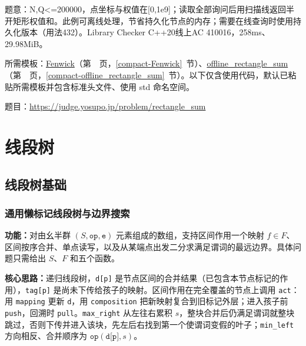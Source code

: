 \label{usage-example-436}

题意：N,Q<=200000，点坐标与权值在[0,1e9]；读取全部询问后用扫描线返回半开矩形权值和。此例可离线处理，节省持久化节点的内存；需要在线查询时使用持久化版本（用法432）。Library Checker C++20线上AC 410016，258ms、29.98MiB。

所需模板：\hyperref[compact-Fenwick]{Fenwick}（第~\pageref{compact-Fenwick}~页，\ref{compact-Fenwick}~节）、\hyperref[compact-offline_rectangle_sum]{offline\_\allowbreak{}rectangle\_\allowbreak{}sum}（第~\pageref{compact-offline_rectangle_sum}~页，\ref{compact-offline_rectangle_sum}~节）。以下仅含使用代码，默认已粘贴所需模板并包含标准头文件、使用 std 命名空间。

题目：\url{https://judge.yosupo.jp/problem/rectangle_sum}



\Needspace{180pt}

\chapter{线段树}

\section{线段树基础}

\subsection{通用懒标记线段树与边界搜索}\label{compact-lazy_segtree}

\noindent\textbf{功能：}\allowbreak 对由幺半群 $(S,\texttt{op},\texttt{e})$ 元素组成的数组，支持区间作用一个映射 $f\in F$、区间按序合并、单点读写，以及从某端点出发二分求满足谓词的最远边界。具体问题只需给出 $S$、$F$ 和五个函数。

\textbf{核心思路：}\allowbreak 递归线段树，\texttt{d[p]} 是节点区间的合并结果（已包含本节点标记的作用），\texttt{tag[p]} 是尚未下传给孩子的映射。区间作用在完全覆盖的节点上调用 \texttt{act}：用 \texttt{mapping} 更新 \texttt{d}，用 \texttt{composition} 把新映射复合到旧标记外层；进入孩子前 \texttt{push}，回溯时 \texttt{pull}。\texttt{max\_right} 从左往右累积 $s$，整块合并后仍满足谓词就整块跳过，否则下传并进入该块，先左后右找到第一个使谓词变假的叶子；\texttt{min\_left} 方向相反、合并顺序为 $\texttt{op}(\texttt{d[p]},s)$。



